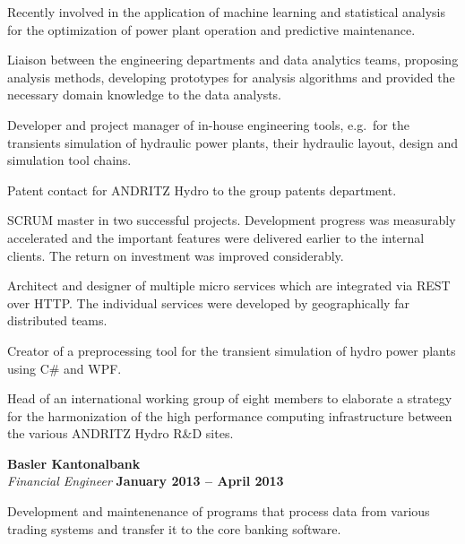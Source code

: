 \documentclass[line,11pt,a4paper]{../resume}
\begin{document}
\begin{resume}
\begin{list2}
  \item Recently involved in the application of machine learning and
    statistical analysis for the optimization of power plant operation and
    predictive maintenance.

  \item Liaison between the engineering departments and data analytics teams,
    proposing analysis methods, developing prototypes for analysis algorithms
    and provided the necessary domain knowledge to the data analysts.

  \item Developer and project manager of in-house engineering tools, e.g.\ for
    the transients simulation of hydraulic power plants, their hydraulic
    layout, design and simulation tool chains.

  \item Patent contact for ANDRITZ Hydro to the group patents department.

  \item SCRUM master in two successful projects. Development progress was
    measurably accelerated and the important features were delivered earlier to
    the internal clients. The return on investment was improved considerably.

  \item Architect and designer of multiple micro services which are integrated
    via REST over HTTP. The individual services were developed by
    geographically far distributed teams.

  \item Creator of a preprocessing tool for the transient simulation of hydro
    power plants using C\# and WPF.

  \item Head of an international working group of eight members to elaborate a
    strategy for the harmonization of the high performance computing
    infrastructure between the various ANDRITZ Hydro R\&D sites.
\end{list2}

\textbf{Basler Kantonalbank} \vspace{2mm}\\\vspace{1mm}%
\textsl{Financial Engineer} \hfill \textbf{January 2013 -- April 2013}\\
\begin{list2}
  \item Development and maintenenance of programs that process data from
    various trading systems and transfer it to the core banking software.
\end{list2}


\end{resume}
\end{document}
